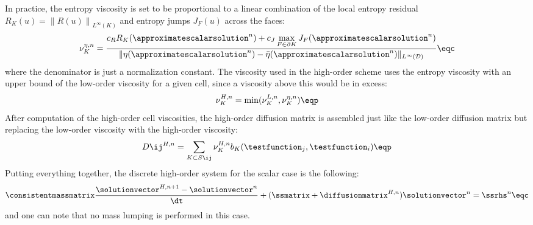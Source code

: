 In practice, the entropy viscosity is set to be proportional to a linear
combination of the local entropy residual $R_K(u) =
\left\|R(u)\right\|_{L^\infty(K)}$ and entropy jumps $J_F(u)$ across the faces:
\begin{equation}
  \nu^{\eta,n}_K = \frac{c_R R_K(\approximatescalarsolution^n)
    + c_J\max\limits_{F\in\partial K}J_F(\approximatescalarsolution^n)}
    {\|\eta(\approximatescalarsolution^n)-\bar{\eta}(\approximatescalarsolution^n)\|_{L^\infty(\mathcal{D})}} \eqc
\end{equation}
where the denominator is just a normalization constant. The viscosity used
in the high-order scheme uses the entropy viscosity with an upper bound
of the low-order viscosity for a given cell, since a viscosity above
this would be in excess:
\begin{equation}
  \nu^{H,n}_K = \min(\nu^{L,n}_K,\nu^{\eta,n}_K) \eqp
\end{equation}
After computation of the high-order cell viscosities, the high-order diffusion
matrix is assembled just like the low-order diffusion matrix but replacing
the low-order viscosity with the high-order viscosity:
\begin{equation}
  D\ij^{H,n} = \sum\limits_{K\subset S\ij}\nu_K^{H,n}
    b_K(\testfunction_j,\testfunction_i) \eqp
\end{equation}
Putting everything together, the discrete high-order system for the scalar
case is the following:
\begin{equation}
  \consistentmassmatrix\frac{\solutionvector^{H,n+1}
    -\solutionvector^n}{\dt} + (\ssmatrix + \diffusionmatrix^{H,n})
    \solutionvector^n = \ssrhs^n \eqc
\end{equation}
and one can note that no mass lumping is performed in this case.
